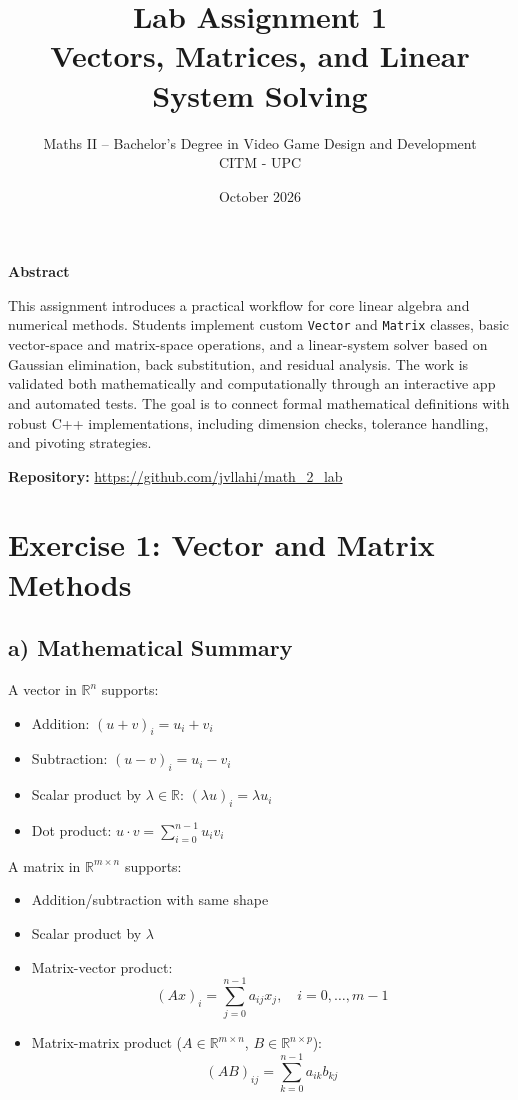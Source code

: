 \documentclass[11pt,a4paper]{article}
\title{\bfseries Lab Assignment 1\\[4pt]
\Large Vectors, Matrices, and Linear System Solving}
\author{Maths II -- Bachelor's Degree in Video Game Design and Development\\CITM - UPC}
\date{October 2026}
\newenvironment{ctxbox}[1]{%
  \par\smallskip\noindent
  \begin{lrbox}{\ctxboxsv}
  \begin{minipage}{\dimexpr\linewidth-2\fboxsep-2\fboxrule\relax}
  \textbf{#1}\par\smallskip
}{%
  \end{minipage}
  \end{lrbox}%
  \noindent\colorbox{panel}{\usebox{\ctxboxsv}}\par\smallskip
}
\begin{document}
\maketitle

\begin{ctxbox}{Abstract}
This assignment introduces a practical workflow for core linear algebra and numerical
methods. Students implement custom \texttt{Vector} and \texttt{Matrix} classes, basic vector-space
and matrix-space operations, and a linear-system solver based on Gaussian elimination,
back substitution, and residual analysis. The work is validated both mathematically and
computationally through an interactive app and automated tests. The goal is to connect
formal mathematical definitions with robust C++ implementations, including dimension
checks, tolerance handling, and pivoting strategies.
\end{ctxbox}

\noindent\textbf{Repository:} \url{https://github.com/jvllahi/math_2_lab}
\par

\section*{Exercise 1: Vector and Matrix Methods}

\subsection*{a) Mathematical Summary}
A vector in $\mathbb{R}^n$ supports:
\begin{itemize}[leftmargin=*]
    \item Addition: $(u+v)_i = u_i + v_i$
    \item Subtraction: $(u-v)_i = u_i - v_i$
    \item Scalar product by $\lambda \in \mathbb{R}$: $(\lambda u)_i = \lambda u_i$
    \item Dot product: $u \cdot v = \sum_{i=0}^{n-1} u_i v_i$
\end{itemize}

A matrix in $\mathbb{R}^{m\times n}$ supports:
\begin{itemize}[leftmargin=*]
    \item Addition/subtraction with same shape
    \item Scalar product by $\lambda$
    \item Matrix-vector product:
    $$
    (Ax)_i = \sum_{j=0}^{n-1} a_{ij}x_j, \quad i=0,\dots,m-1
    $$
    \item Matrix-matrix product ($A\in\mathbb{R}^{m\times n}$, $B\in\mathbb{R}^{n\times p}$):
    $$
    (AB)_{ij} = \sum_{k=0}^{n-1} a_{ik}b_{kj}
    $$
\end{itemize}
\end{document}
